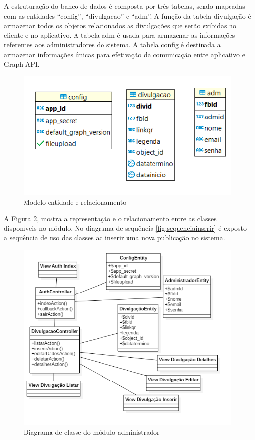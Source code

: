 A estruturação do banco de dados é composta por três tabelas, sendo mapeadas com as entidades ``config'', ``divulgacao'' e ``adm''. A função da tabela divulgação é armazenar todos os objetos relacionados as divulgações que serão exibidas no cliente e no aplicativo. A tabela adm é usada para armazenar as informações referentes aos administradores do sistema. A tabela config é destinada a armazenar informações únicas para efetivação da comunicação entre aplicativo e Graph API.

\begin{figure}[H]
\centering
\includegraphics[scale=1.2]{figuras/entidaderelacionamento}
\caption{Modelo entidade e relacionamento}
\label{fig:casosDeUso}
\end{figure}

A Figura \ref{fig:diagramaclasseADM}, mostra a representação e o relacionamento entre as classes disponíveis no módulo. No diagrama de sequência \ref{fig:sequenciainserir} é exposto a sequência de uso das classes ao inserir uma nova publicação no sistema. 
\begin{figure}[H]
\centering
\includegraphics[scale=0.7]{figuras/diagramaclasseADM}
\caption{Diagrama de classe do módulo administrador}
\label{fig:diagramaclasseADM}
\end{figure}

